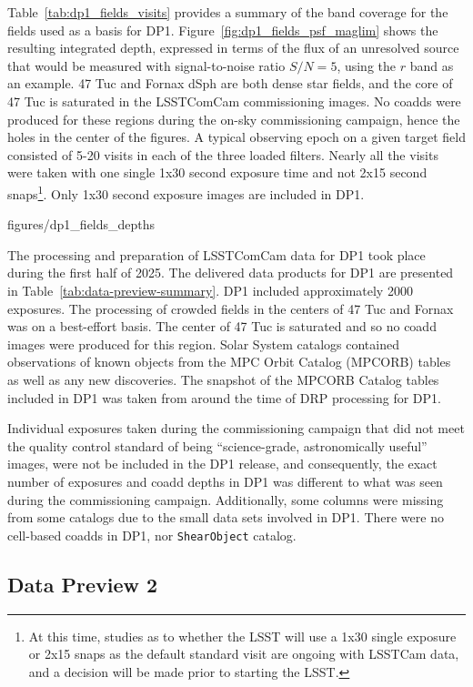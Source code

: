 Table~\ref{tab:dp1_fields_visits} provides a summary of the band coverage for the  fields  used as a basis for DP1.
Figure~\ref{fig:dp1_fields_psf_maglim} shows the resulting integrated depth, expressed in terms of the flux of an unresolved source that would be measured with signal-to-noise ratio $S/N = 5$, using the $r$ band as an example.
47 Tuc and Fornax dSph are both dense star fields, and the core of 47 Tuc is saturated in the LSSTComCam commissioning images.
No coadds were produced for these regions during the on-sky commissioning campaign, hence the holes in the center of the figures.
A typical observing epoch on a given target field consisted of 5-20 visits in each of the three loaded filters.
Nearly all the visits  were taken with one single 1x30 second exposure time and not  2x15 second snaps\footnote{At this time, studies as to whether the LSST will use a 1x30 single exposure or 2x15 snaps as the default standard visit are ongoing with LSSTCam data, and a decision will be made prior to starting the LSST. }.
Only 1x30 second exposure images are included in DP1.

 {figures/dp1_fields_depths}

The  processing and preparation of LSSTComCam data for DP1 took place during the first half of 2025.
The delivered data products for DP1 are presented in Table~\ref{tab:data-preview-summary}.
DP1 included approximately 2000 exposures.
The processing of crowded fields in the centers of 47 Tuc and Fornax was on a best-effort basis.
The center of 47 Tuc is saturated and so no coadd images were  produced for this region.
Solar System catalogs contained observations of known objects from the MPC Orbit Catalog (MPCORB) tables as well as any new discoveries.
The snapshot of the MPCORB Catalog tables included in DP1 was taken from around the time of DRP processing for DP1.

Individual exposures taken during the commissioning campaign  that did not meet the quality control standard of being ``science-grade, astronomically useful'' images, were not be included in the DP1 release,  and consequently, the exact number of exposures and coadd depths in DP1 was different to what was seen during the commissioning campaign.
Additionally, some columns were missing from some catalogs due to the small data sets involved in DP1.
There were  no cell-based coadds in DP1, nor \texttt{ShearObject} catalog.

\subsection{Data Preview 2}
\label{ssec:dp2}

